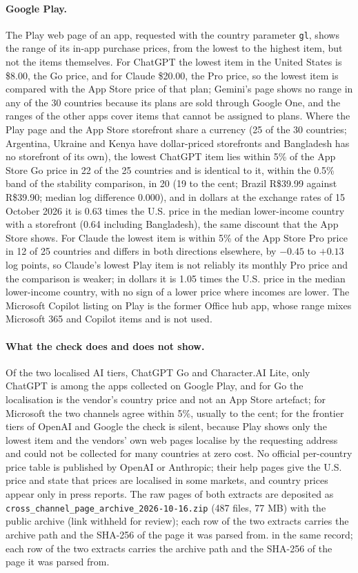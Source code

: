 \documentclass[11pt]{article}
\theoremstyle{definition}
\theoremstyle{remark}
\begin{document}
\paragraph{Google Play.} The Play web page of an app, requested with the country parameter \texttt{gl}, shows the range of its in-app purchase prices, from the lowest to the highest item, but not the items themselves. For ChatGPT the lowest item in the United States is \$8.00, the Go price, and for Claude \$20.00, the Pro price, so the lowest item is compared with the App Store price of that plan; Gemini's page shows no range in any of the 30 countries because its plans are sold through Google One, and the ranges of the other apps cover items that cannot be assigned to plans. Where the Play page and the App Store storefront share a currency (25 of the 30 countries; Argentina, Ukraine and Kenya have dollar-priced storefronts and Bangladesh has no storefront of its own), the lowest ChatGPT item lies within 5\% of the App Store Go price in 22 of the 25 countries and is identical to it, within the 0.5\% band of the stability comparison, in 20 (19 to the cent; Brazil R\$39.99 against R\$39.90; median log difference 0.000), and in dollars at the exchange rates of 15 October 2026 it is 0.63 times the U.S. price in the median lower-income country with a storefront (0.64 including Bangladesh), the same discount that the App Store shows. For Claude the lowest item is within 5\% of the App Store Pro price in 12 of 25 countries and differs in both directions elsewhere, by $-0.45$ to $+0.13$ log points, so Claude's lowest Play item is not reliably its monthly Pro price and the comparison is weaker; in dollars it is 1.05 times the U.S. price in the median lower-income country, with no sign of a lower price where incomes are lower. The Microsoft Copilot listing on Play is the former Office hub app, whose range mixes Microsoft 365 and Copilot items and is not used.

\paragraph{What the check does and does not show.} Of the two localised AI tiers, ChatGPT Go and Character.AI Lite, only ChatGPT is among the apps collected on Google Play, and for Go the localisation is the vendor's country price and not an App Store artefact; for Microsoft the two channels agree within 5\%, usually to the cent; for the frontier tiers of OpenAI and Google the check is silent, because Play shows only the lowest item and the vendors' own web pages localise by the requesting address and could not be collected for many countries at zero cost. No official per-country price table is published by OpenAI or Anthropic; their help pages give the U.S. price and state that prices are localised in some markets, and country prices appear only in press reports. The raw pages of both extracts are deposited as \texttt{cross\_channel\_page\_archive\_2026-10-16.zip} (487 files, 77 MB)
\ifanon
with the public archive (link withheld for review); each row of the two extracts carries the archive path and the SHA-256 of the page it was parsed from.
\else
in the same record; each row of the two extracts carries the archive path and the SHA-256 of the page it was parsed from.
\fi
\end{document}
